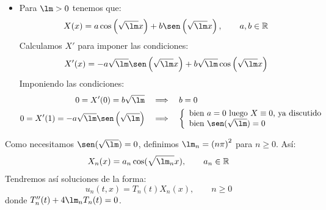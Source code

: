 \begin{ejemplo}
\begin{itemize}
            Esto no pasaba en problemas tipo Dirichlet, pero ahora estamos con condiciones tipo Neumann.
        \item Para $\lm > 0$ tenemos que:
            \begin{equation*}
               X(x) = a\cos\left(\sqrt{\lm}x\right)  + b\sen\left(\sqrt{\lm}x\right), \qquad a,b\in \mathbb{R}
            \end{equation*}
            Calculamos $X'$ para imponer las condiciones:
            \begin{equation*}
                X'(x) = -a\sqrt{\lm}\sen\left(\sqrt{\lm}x\right) + b\sqrt{\lm}\cos\left(\sqrt{\lm}x\right)
            \end{equation*}
            Imponiendo las condiciones:
            \begin{align*}
                0 = X'(0) = b\sqrt{\lm} &\quad\Longrightarrow\quad b = 0 \\
                0 = X'(1) = -a\sqrt{\lm}\sen\left(\sqrt{\lm}\right) &\quad\Longrightarrow\quad \left\{\begin{array}{l}
                    \text{bien\ } a = 0 \text{\ luego\ } X\equiv 0 \text{,\ ya discutido}\\
                    \text{bien\ } \sen(\sqrt{\lm}) = 0 
                \end{array}\right.
            \end{align*}
    \end{itemize}
    Como necesitamos $\sen(\sqrt{\lm}) = 0$, definimos $\lm_n = {(n\pi)}^{2}$ para $n\geq 0$. Así:
    \begin{equation*}
        X_n(x) = a_n\cos(\sqrt{\lm_n}x), \qquad a_n \in \mathbb{R}
    \end{equation*}
    Tendremos así soluciones de la forma:
    \begin{equation*}
        u_n(t,x) = T_n(t)X_n(x), \qquad n\geq 0
    \end{equation*}
    donde $T_n''(t) + 4\lm_n T_n(t) = 0$.\\


\end{ejemplo}
